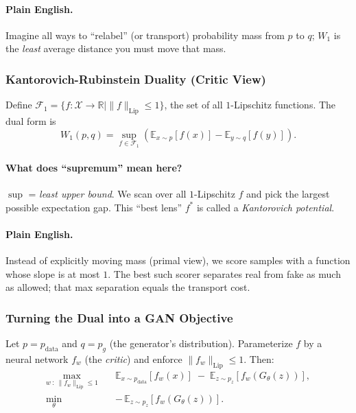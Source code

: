 \documentclass[11pt]{article}
\theoremstyle{remark}
\begin{document}
\paragraph{Plain English.}
Imagine all ways to ``relabel'' (or transport) probability mass from $p$ to $q$; $W_1$ is the \emph{least} average distance you must move that mass.

\subsubsection{Kantorovich-Rubinstein Duality (Critic View)}
Define $\mathcal{F}_1=\{f:\mathcal{X}\to\mathbb{R} \mid \|f\|_{\mathrm{Lip}}\le 1\}$, the set of all $1$-Lipschitz functions. The dual form is
\begin{equation}
W_1(p,q)=\sup_{f\in\mathcal{F}_1}\left(\mathbb{E}_{x\sim p}[f(x)]-\mathbb{E}_{y\sim q}[f(y)]\right).
\label{eq:dual}
\end{equation}

\paragraph{What does ``supremum'' mean here?}
$\sup$ = \emph{least upper bound}. We scan over all $1$-Lipschitz $f$ and pick the largest possible expectation gap. This ``best lens'' $f^*$ is called a \emph{Kantorovich potential}.

\paragraph{Plain English.}
Instead of explicitly moving mass (primal view), we score samples with a function whose slope is at most $1$. The best such scorer separates real from fake as much as allowed; that max separation equals the transport cost.

\subsubsection{Turning the Dual into a GAN Objective}
Let $p=p_{\text{data}}$ and $q=p_g$ (the generator's distribution). Parameterize $f$ by a neural network $f_w$ (the \emph{critic}) and enforce $\|f_w\|_{\mathrm{Lip}}\le 1$. Then:
\begin{align}
\max_{w \ : \ \|f_w\|_{\mathrm{Lip}}\le 1} \quad
& \mathbb{E}_{x\sim p_{\text{data}}}[f_w(x)] \;-\; \mathbb{E}_{z\sim p_z}[f_w(G_\theta(z))],
\label{eq:wgan-critic}\\
\min_{\theta} \quad
& -\,\mathbb{E}_{z\sim p_z}[f_w(G_\theta(z))].
\label{eq:wgan-gen}
\end{align}
\end{document}
